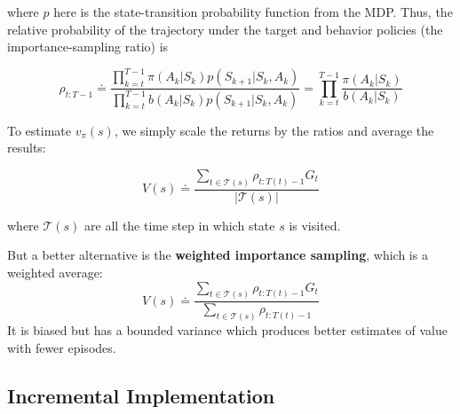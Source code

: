 \documentclass[11pt]{article}
\begin{document}
where \(p\) here is the state-transition probability function from the MDP. Thus,
the relative probability of the trajectory under the target and behavior
policies (the importance-sampling ratio) is

\begin{equation}
\rho_{t:T-1} \doteq \frac{\prod_{k=t}^{T-1} \pi(A_{k}|S_{k}) p(S_{k+1}|S_{k}, A_{k})}
{\prod_{k=t}^{T-1} b(A_{k}|S_{k}) p(S_{k+1}|S_{k}, A_{k})}
= \prod\limits_{k=t}^{T-1} \frac{\pi(A_{k}|S_{k})}{b(A_{k}|S_{k})}
\end{equation}

To estimate \(v_{\pi}(s)\), we simply scale the returns by the ratios and average
the results:

\begin{equation}
V(s) \doteq \frac{\sum_{t \in \mathcal{T}(s)} \rho_{t:T(t)-1} G_{t}}{|\mathcal{T}(s)|}
\end{equation}

where \(\mathcal{T}(s)\) are all the time step in which state \(s\) is visited.

But a better alternative is the \textbf{weighted importance sampling}, which is a
weighted average:
\begin{equation}
V(s) \doteq \frac{\sum_{t \in \mathcal{T}(s)} \rho_{t:T(t)-1} G_{t}}
{\sum_{t \in \mathcal{T}(s)} \rho_{t:T(t)-1}}
\end{equation}
It is biased but has a bounded variance which produces better estimates of value
with fewer episodes.

\subsection{Incremental Implementation}
\label{sec:orgb854813}
\end{document}
